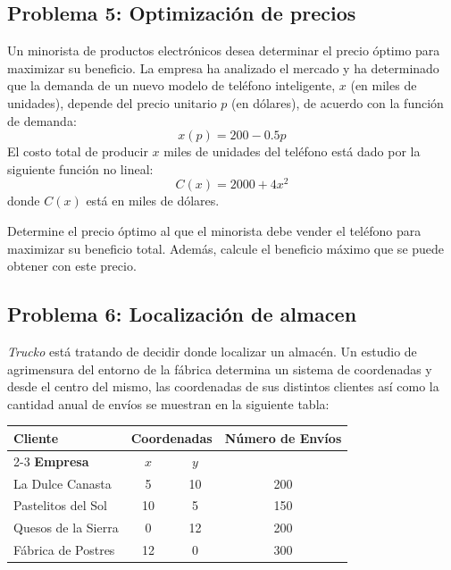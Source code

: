 \documentclass[12pt]{article}
\begin{document}
\subsection*{Problema 5: Optimización de precios}

Un minorista de productos electr\'{o}nicos desea determinar el precio \'{o}ptimo para maximizar su beneficio. La empresa ha analizado el mercado y ha determinado que la demanda de un nuevo modelo de tel\'{e}fono inteligente, $x$ (en miles de unidades), depende del precio unitario $p$ (en d\'{o}lares), de acuerdo con la funci\'{o}n de demanda:
\[ x(p) = 200 - 0.5p \]
El costo total de producir $x$ miles de unidades del tel\'{e}fono est\'{a} dado por la siguiente funci\'{o}n no lineal:
\[ C(x) = 2000 + 4x^2 \]
donde $C(x)$ est\'{a} en miles de d\'{o}lares.

Determine el precio \'{o}ptimo al que el minorista debe vender el tel\'{e}fono para maximizar su beneficio total. Adem\'{a}s, calcule el beneficio m\'{a}ximo que se puede obtener con este precio.

\subsection*{Problema 6: Localización de almacen}

\textit{Trucko} está tratando de decidir donde localizar un almacén. Un estudio de agrimensura del entorno de la fábrica determina un sistema de coordenadas y desde el centro del mismo, las coordenadas de sus distintos clientes así como la cantidad anual de envíos se muestran en la siguiente tabla:
\begin{table}[h!]
    \centering
    \label{tab:shipments}
    \begin{tabular}{lccc}
        \toprule
        \textbf{Cliente} & \multicolumn{2}{c}{\textbf{Coordenadas}} & \textbf{Número de Envíos} \\
        \cmidrule(lr){2-3}
        \textbf{Empresa} & \textbf{$x$} & \textbf{$y$} & \\
        \midrule
        La Dulce Canasta & 5 & 10 & 200 \\
        Pastelitos del Sol & 10 & 5 & 150 \\
        Quesos de la Sierra & 0 & 12 & 200 \\
        Fábrica de Postres & 12 & 0 & 300 \\
        \bottomrule
    \end{tabular}
\end{table}
\end{document}
